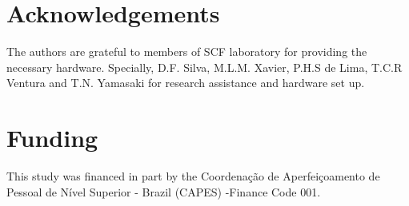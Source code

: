 \section*{Acknowledgements}
The authors are grateful to members of SCF laboratory for providing the necessary hardware. Specially, D.F. Silva, M.L.M. Xavier, P.H.S de Lima, T.C.R Ventura and T.N. Yamasaki for research assistance and hardware set up.

\section*{Funding}
This study was financed in part by the Coordenação de Aperfeiçoamento de Pessoal de Nível Superior - Brazil (CAPES) -Finance Code 001.
\printbibliography[segment=\therefsegment,heading=subbibliography, title={References}]